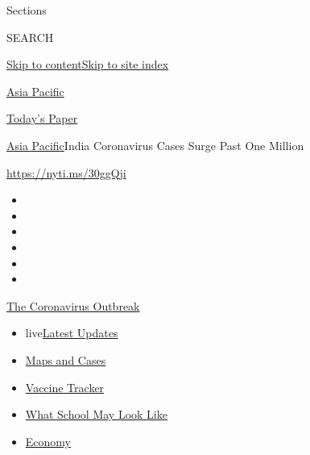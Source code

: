 Sections

SEARCH

\protect\hyperlink{site-content}{Skip to
content}\protect\hyperlink{site-index}{Skip to site index}

\href{https://www.nytimes.com/section/world/asia}{Asia Pacific}

\href{https://myaccount.nytimes.com/auth/login?response_type=cookie\&client_id=vi}{}

\href{https://www.nytimes.com/section/todayspaper}{Today's Paper}

\href{/section/world/asia}{Asia Pacific}\textbar{}India Coronavirus
Cases Surge Past One Million

\url{https://nyti.ms/30ggQji}

\begin{itemize}
\item
\item
\item
\item
\item
\item
\end{itemize}

\href{https://www.nytimes.com/news-event/coronavirus?action=click\&pgtype=Article\&state=default\&region=TOP_BANNER\&context=storylines_menu}{The
Coronavirus Outbreak}

\begin{itemize}
\tightlist
\item
  live\href{https://www.nytimes.com/2020/08/02/world/coronavirus-updates.html?action=click\&pgtype=Article\&state=default\&region=TOP_BANNER\&context=storylines_menu}{Latest
  Updates}
\item
  \href{https://www.nytimes.com/interactive/2020/us/coronavirus-us-cases.html?action=click\&pgtype=Article\&state=default\&region=TOP_BANNER\&context=storylines_menu}{Maps
  and Cases}
\item
  \href{https://www.nytimes.com/interactive/2020/science/coronavirus-vaccine-tracker.html?action=click\&pgtype=Article\&state=default\&region=TOP_BANNER\&context=storylines_menu}{Vaccine
  Tracker}
\item
  \href{https://www.nytimes.com/interactive/2020/07/29/us/schools-reopening-coronavirus.html?action=click\&pgtype=Article\&state=default\&region=TOP_BANNER\&context=storylines_menu}{What
  School May Look Like}
\item
  \href{https://www.nytimes.com/live/2020/07/31/business/stock-market-today-coronavirus?action=click\&pgtype=Article\&state=default\&region=TOP_BANNER\&context=storylines_menu}{Economy}
\end{itemize}

